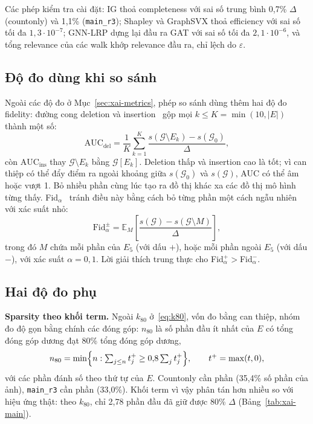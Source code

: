 Các phép kiểm tra cài đặt: IG thoả completeness với sai số trung bình 0,7\% $\Delta$ (countonly) và 1,1\% (\texttt{main\_r3});
Shapley và GraphSVX thoả efficiency với sai số tối đa $1{,}3\cdot10^{-7}$; GNN-LRP dựng lại đầu ra GAT với sai số tối đa
$2{,}1\cdot10^{-6}$, và tổng relevance của các walk khớp relevance đầu ra, chỉ lệch do $\varepsilon$.

\subsection{Độ đo dùng khi so sánh}\label{sec:xai-compare-metrics}
Ngoài các độ đo ở Mục~\ref{sec:xai-metrics}, phép so sánh dùng thêm hai độ đo fidelity: đường cong deletion và insertion~\cite{xai-petsiuk2018rise}
gộp mọi $k\le K=\min(10,|E|)$ thành một số:
\begin{equation}
  \mathrm{AUC}_{\text{del}}=\frac{1}{K}\sum_{k=1}^{K}\frac{s(\mathcal{G}\setminus E_k)-s(\mathcal{G}_0)}{\Delta},
  \label{eq:auc}
\end{equation}
còn $\mathrm{AUC}_{\text{ins}}$ thay $\mathcal{G}\setminus E_k$ bằng $\mathcal{G}[E_k]$. Deletion thấp và insertion cao là
tốt; vì can thiệp có thể đẩy điểm ra ngoài khoảng giữa $s(\mathcal{G}_0)$ và $s(\mathcal{G})$, AUC có thể âm hoặc vượt 1.
Bỏ nhiều phần cùng lúc tạo ra đồ thị khác xa các đồ thị mô hình từng thấy. Fid$_{\alpha}$~\cite{xai-zheng2024fidalpha} tránh
điều này bằng cách bỏ từng phần một cách ngẫu nhiên với xác suất nhỏ:
\begin{equation}
  \mathrm{Fid}_{\alpha}^{\pm}=\mathbb{E}_{M}\!\left[\frac{s(\mathcal{G})-s(\mathcal{G}\setminus M)}{\Delta}\right],
  \label{eq:fid-alpha}
\end{equation}
trong đó $M$ chứa mỗi phần của $E_5$ (với dấu $+$), hoặc mỗi phần ngoài $E_5$ (với dấu $-$), với xác suất $\alpha=0{,}1$.
Lời giải thích trung thực cho Fid$_{\alpha}^{+}>{}$Fid$_{\alpha}^{-}$.

\subsection{Hai độ đo phụ}\label{sec:xai-extra-metrics}
\textbf{Sparsity theo khối term.} Ngoài $k_{80}$ ở~\eqref{eq:k80}, vốn đo bằng can thiệp, nhóm đo độ gọn bằng chính các đóng
góp: $n_{80}$ là số phần đầu ít nhất của $E$ có tổng đóng góp dương đạt 80\% tổng đóng góp dương,
\begin{equation}
  n_{80}=\min\Bigl\{n:\textstyle\sum_{j\le n}t_j^{+}\ge0{,}8\sum_{j}t_j^{+}\Bigr\},\qquad t^{+}=\max(t,0),
  \label{eq:n80}
\end{equation}
với các phần đánh số theo thứ tự của $E$. Countonly cần  phần (35,4\% số phần của ảnh), \texttt{main\_r3}
cần  phần (33,0\%). Khối term vì vậy phân tán hơn nhiều so với hiệu ứng thật: theo $k_{80}$, chỉ 2,78 phần
đầu đã giữ được 80\% $\Delta$ (Bảng~\ref{tab:xai-main}).

